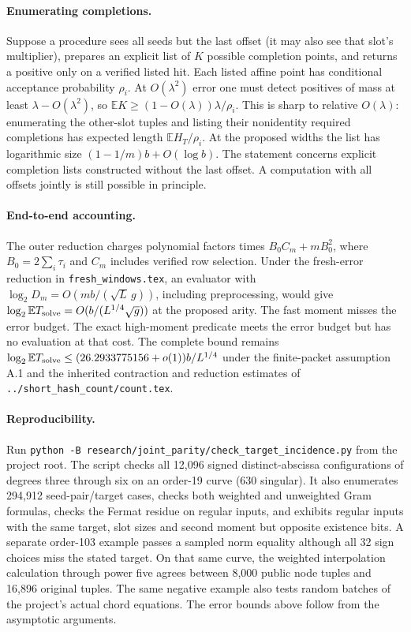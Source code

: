 \documentclass[11pt]{article}
\newcommand{\E}{\mathbb E}
\begin{document}
\paragraph{Enumerating completions.}
Suppose a procedure sees all seeds but the last offset (it may also see
that slot's multiplier), prepares an explicit list of $K$ possible
completion points, and returns a positive only on a verified listed hit.
Each listed affine point has conditional acceptance probability $\rho_i$.
At $O(\lambda^2)$ error one must detect positives of mass at least
$\lambda-O(\lambda^2)$, so
$\E K\ge(1-O(\lambda))\lambda/\rho_i$. This is sharp to relative
$O(\lambda)$: enumerating the other-slot tuples and listing their
nonidentity required completions has expected length $\E H_T/\rho_i$.
At the proposed widths the list has logarithmic size
$(1-1/m)b+O(\log b)$. The statement concerns explicit completion lists
constructed without the last offset. A computation with all offsets jointly
is still possible in principle.

\paragraph{End-to-end accounting.}
The outer reduction charges polynomial factors times $B_0 C_m+mB_0^2$,
where $B_0=2\sum_i\tau_i$ and $C_m$ includes verified row selection.
Under the fresh-error reduction in \texttt{fresh\_windows.tex}, an evaluator
with $\log_2 D_m=O(mb/(\sqrt L\,g))$, including preprocessing, would give
$\log_2\E T_{\rm solve}=O(b/(L^{1/4}\sqrt g))$ at the proposed arity.
The fast moment misses the error budget. The exact high-moment predicate
meets the error budget but has no evaluation at that cost.
The complete bound remains
$\log_2\E T_{\rm solve}\le(26.2933775156+o(1))b/L^{1/4}$
under the finite-packet assumption A.1 and the inherited contraction and
reduction estimates of \texttt{../short\_hash\_count/count.tex}.

\paragraph{Reproducibility.}
Run \texttt{python -B research/joint\_parity/check\_target\_incidence.py}
from the project root. The script checks all 12,096 signed distinct-abscissa
configurations of degrees three through six on an order-19 curve (630 singular).
It also enumerates 294,912 seed-pair/target cases, checks both weighted
and unweighted Gram formulas, checks the Fermat residue on regular inputs,
and exhibits regular inputs with the same target, slot sizes and second
moment but opposite existence bits. A separate order-103 example passes a
sampled norm equality although all 32 sign choices miss the stated target.
On that same curve, the weighted interpolation calculation through power
five agrees between 8,000 public node tuples and 16,896 original tuples.
The same negative example also tests random batches of the project's
actual chord equations. The error bounds above follow from the
asymptotic arguments.
\end{document}
